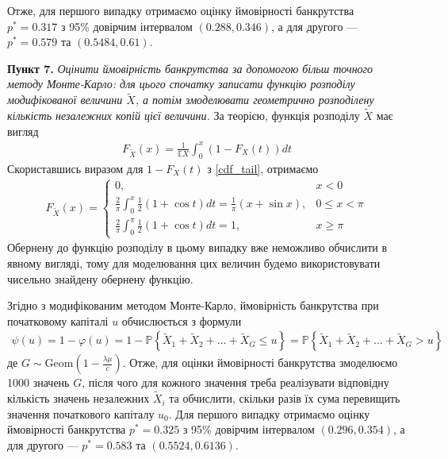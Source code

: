 \documentclass{extreport}
\renewcommand{\P}{\mathbb{P}}
\newcommand{\E}{\mathbb{E}}
\newcommand{\task}[1]{\vspace{0.5em}\noindent\textbf{#1.}}
\begin{document}
Отже, для першого випадку отримаємо оцінку ймовірності банкрутства $p^* = 0.317$ з 95\% довірчим інтервалом $(0.288, 0.346)$,
а для другого --- $p^* = 0.579$ та $(0.5484, 0.61)$.

\task{Пункт 7} \emph{Оцінити ймовірність банкрутства за допомогою більш точного методу Монте-Карло: для цього спочатку записати функцію розподілу
модифікованої величини $\tilde{X}$, а потім змоделювати геометрично розподілену кількість незалежних копій цієї величини.} За теорією,
функція розподілу $\tilde{X}$ має вигляд
\begin{gather}
    F_{\tilde{X}}(x) = \frac{1}{\E X} \int_0^x \left(1 - F_X(t)\right) dt
\end{gather}
Скориставшись виразом для $1 - F_X(t)$ з \eqref{cdf_tail}, отримаємо 
\begin{gather}
    F_{\tilde{X}}(x) = \begin{cases}
        0, & x < 0 \\
        \frac{2}{\pi} \int_0^x \frac{1}{2}\left(1 + \cos t\right) dt = \frac{1}{\pi} \left(x + \sin x\right), & 0 \leq x < \pi \\
        \frac{2}{\pi} \int_0^{\pi} \frac{1}{2}\left(1 + \cos t\right) dt = 1, & x \geq \pi 
    \end{cases}
\end{gather}
Обернену до функцію розподілу в цьому випадку вже неможливо обчислити в явному вигляді, тому
для моделювання цих величин будемо використовувати чисельно знайдену обернену функцію.

Згідно з модифікованим методом Монте-Карло, ймовірність банкрутства при початковому капіталі $u$ обчислюється з формули
\begin{gather*}
    \psi(u) = 1 - \varphi(u) = 1 - \P\left\{
        \tilde{X}_1 + \tilde{X}_2 + \dots + \tilde{X}_G \leq u
    \right\} = \P\left\{
        \tilde{X}_1 + \tilde{X}_2 + \dots + \tilde{X}_G > u
    \right\}
\end{gather*}
де $G \sim \mathrm{Geom}\left(1 - \frac{\lambda \mu}{c}\right)$. Отже, для оцінки ймовірності банкрутства змоделюємо 1000 значень $G$,
після чого для кожного значення треба реалізувати відповідну кількість значень незалежних $\tilde{X}_i$ та обчислити, 
скільки разів їх сума перевищить значення початкового капіталу $u_0$.
Для першого випадку отримаємо оцінку ймовірності банкрутства $p^* = 0.325$ з 95\% довірчим інтервалом $(0.296, 0.354)$,
а для другого --- $p^* = 0.583$ та $(0.5524, 0.6136)$.
\end{document}
